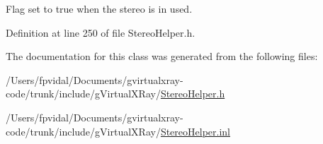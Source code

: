 Flag set to true when the stereo is in used. 



Definition at line 250 of file StereoHelper.h.



The documentation for this class was generated from the following files:\begin{DoxyCompactItemize}
\item 
/Users/fpvidal/Documents/gvirtualxray-\/code/trunk/include/gVirtualXRay/\hyperlink{_stereo_helper_8h}{StereoHelper.h}\item 
/Users/fpvidal/Documents/gvirtualxray-\/code/trunk/include/gVirtualXRay/\hyperlink{_stereo_helper_8inl}{StereoHelper.inl}\end{DoxyCompactItemize}

